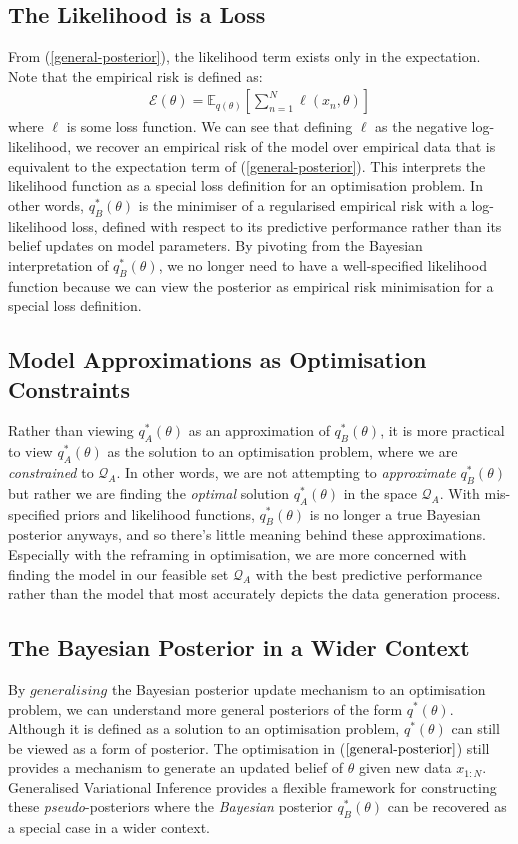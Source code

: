 \documentclass[twoside,11pt]{article}
\begin{document}
\subsection{The Likelihood is a Loss}
From (\ref{general-posterior}), the likelihood term exists only in the expectation. Note that the empirical risk is defined as:
\begin{align}
\mathcal{E}(\theta) = \mathbb{E}_{q(\theta)}\left[\sum_{n=1}^N \ell\left(x_n, \theta\right)\right]
\label{empirical-risk}
\end{align}
where $\ell$ is some loss function. We can see that defining $\ell$ as the negative log-likelihood, we recover an empirical risk of the model over empirical data that is equivalent to the expectation term of (\ref{general-posterior}). This interprets the likelihood function as a special loss definition for an optimisation problem. In other words, $q_B^*(\theta)$ is the minimiser of a regularised empirical risk with a log-likelihood loss, defined with respect to its predictive performance rather than its belief updates on model parameters. By pivoting from the Bayesian interpretation of $q_B^*(\theta)$, we no longer need to have a well-specified likelihood function because we can view the posterior as empirical risk minimisation for a special loss definition.

\subsection{Model Approximations as Optimisation Constraints}
Rather than viewing $q_A^*(\theta)$ as an approximation of $q_B^*(\theta)$, it is more practical to view $q_A^*(\theta)$ as the solution to an optimisation problem, where we are \textit{constrained} to $\mathcal{Q}_{A}$. In other words, we are not attempting to \textit{approximate} $q_B^*(\theta)$ but rather we are finding the \textit{optimal} solution $q_A^*(\theta)$ in the space $\mathcal{Q}_{A}$. With mis-specified priors and likelihood functions, $q_B^*(\theta)$  is no longer a true Bayesian posterior anyways, and so there's little meaning behind these approximations. Especially with the reframing in optimisation, we are more concerned with finding the model in our feasible set $\mathcal{Q}_{A}$ with the best predictive performance rather than the model that most accurately depicts the data generation process.
\subsection{The Bayesian Posterior in a Wider Context}
By $\textit{generalising}$ the Bayesian posterior update mechanism to an optimisation problem, we can understand more general posteriors of the form $q^*(\theta)$. Although it is defined as a solution to an optimisation problem, $q^*(\theta)$ can still be viewed as a form of posterior. The optimisation in ($\ref{general-posterior}$) still provides a mechanism to generate an updated belief of $\theta$ given new data $x_{1:N}$. Generalised Variational Inference provides a flexible framework for constructing these \textit{pseudo}-posteriors where the \textit{Bayesian} posterior $q_B^*(\theta)$ can be recovered as a special case in a wider context.
\end{document}
